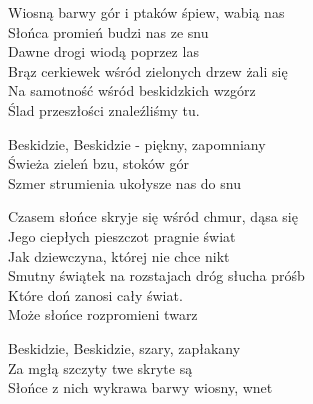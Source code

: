 
\begin{text}
    Wiosną barwy gór i ptaków śpiew, wabią nas\\
    Słońca promień budzi nas ze snu\\
    Dawne drogi wiodą poprzez las\\
    Brąz cerkiewek wśród zielonych drzew żali się\\
    Na samotność wśród beskidzkich wzgórz\\
    Ślad przeszłości znaleźliśmy tu.

    Beskidzie, Beskidzie - piękny, zapomniany\\
    Świeża zieleń bzu, stoków gór\\
    Szmer strumienia ukołysze nas do snu

    Czasem słońce skryje się wśród chmur, dąsa się\\
    Jego ciepłych pieszczot pragnie świat\\
    Jak dziewczyna, której nie chce nikt\\
    Smutny świątek na rozstajach dróg słucha próśb\\
    Które doń zanosi cały świat.\\
    Może słońce rozpromieni twarz

    Beskidzie, Beskidzie, szary, zapłakany\\
    Za mgłą szczyty twe skryte są\\
    Słońce z nich wykrawa barwy wiosny, wnet
\end{text}
\begin{chord}

\end{chord}